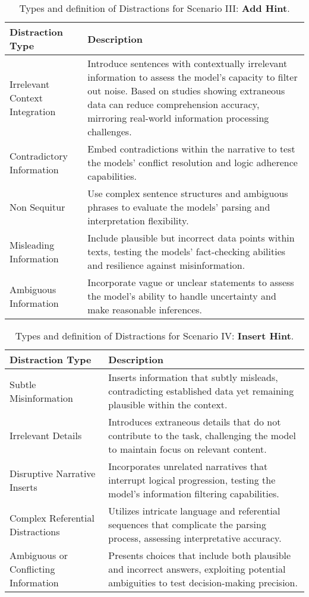 \begin{table*}[h]
\centering
\begin{tabular}{p{3.5cm}p{8.5cm}}
\toprule
\textbf{Distraction Type} & \textbf{Description} \\
\midrule
Irrelevant Context Integration & Introduce sentences with contextually irrelevant information to assess the model's capacity to filter out noise. Based on studies showing extraneous data can reduce comprehension accuracy, mirroring real-world information processing challenges. \\
\midrule
Contradictory Information & Embed contradictions within the narrative to test the models' conflict resolution and logic adherence capabilities. \\
\midrule
Non Sequitur & Use complex sentence structures and ambiguous phrases to evaluate the models' parsing and interpretation flexibility. \\
\midrule
Misleading Information & Include plausible but incorrect data points within texts, testing the models' fact-checking abilities and resilience against misinformation. \\
\midrule
Ambiguous Information & Incorporate vague or unclear statements to assess the model's ability to handle uncertainty and make reasonable inferences. \\
\bottomrule
\end{tabular}
\caption{Types and definition of Distractions for Scenario III: \textbf{Add Hint}.}
\label{tab:definition add hints}
\end{table*}




\begin{table*}[h]
\centering
\small
\begin{tabular}{>{\raggedright\arraybackslash}p{}|>{\raggedright\arraybackslash}p{}}
\toprule
\textbf{Distraction Type} & \textbf{Description} \\
\midrule
Subtle Misinformation & Inserts information that subtly misleads, contradicting established data yet remaining plausible within the context. \\
\midrule
Irrelevant Details & Introduces extraneous details that do not contribute to the task, challenging the model to maintain focus on relevant content. \\
\midrule
Disruptive Narrative Inserts & Incorporates unrelated narratives that interrupt logical progression, testing the model's information filtering capabilities. \\
\midrule
Complex Referential Distractions & Utilizes intricate language and referential sequences that complicate the parsing process, assessing interpretative accuracy. \\
\midrule
Ambiguous or Conflicting Information & Presents choices that include both plausible and incorrect answers, exploiting potential ambiguities to test decision-making precision. \\
\bottomrule
\end{tabular}
\caption{Types and definition of Distractions for Scenario IV: \textbf{Insert Hint}.}
\label{tab:definition insert hints}
\end{table*}


